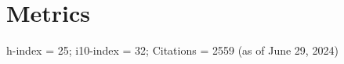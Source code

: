 \documentclass[margin,line,12pt]{res}
\newcommand\reverselabel[1]{%
  \def\theenumi{}%
  \renewcommand\makelabel{\makebox[\dimexpr\labelwidth-3pt\relax][r]{%
    \the\numexpr#1-\value{enumi}+1\relax}}}%
\begin{document}
\begin{resume}
\begin{itemize}







\end{itemize}

\section{\sc Metrics}
h-index = 25; i10-index = 32; Citations = 2559 (as of June 29, 2024)





\end{resume}
\end{document}
